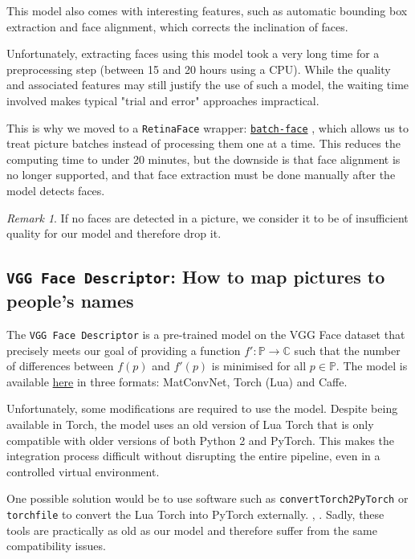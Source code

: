 \documentclass[9pt,twocolumn,twoside]{ilcss}
\theoremstyle{definition}
\theoremstyle{remark}
\newtheorem{remark}{Remark}[section]
\theoremstyle{definition}
\theoremstyle{definition}
\begin{document}
        This model also comes with interesting features, such as automatic bounding box extraction and face alignment, which corrects the inclination of faces.

        Unfortunately, extracting faces using this model took a very long time for a preprocessing step (between 15 and 20 hours using a CPU). While the quality and associated features may still justify the use of such a model, the waiting time involved makes typical "trial and error" approaches impractical.
        
        This is why we moved to a \texttt{RetinaFace} wrapper: \href{https://github.com/elliottzheng/batch-face}{\texttt{batch-face}} \cite{batchFace}, which allows us to treat picture batches instead of processing them one at a time. This reduces the computing time to under 20 minutes, but the downside is that face alignment is no longer supported, and that face extraction must be done manually after the model detects faces.

        \begin{remark}
            If no faces are detected in a picture, we consider it to be of insufficient quality for our model and therefore drop it.
        \end{remark}

    \subsection{\texttt{VGG Face Descriptor}: How to map pictures to people's names}
        The \texttt{VGG Face Descriptor} is a pre-trained model on the VGG Face dataset that precisely meets our goal of providing a function $f':\mathbb{P}\to\mathbb{C}$ such that the number of differences between $f(p)$ and $f'(p)$ is minimised for all $p\in\mathbb{P}$. The model is available \href{https://www.robots.ox.ac.uk/~vgg/software/vgg_face/}{here} in three formats: MatConvNet, Torch (Lua) and Caffe. 
        
        Unfortunately, some modifications are required to use the model. Despite being available in Torch, the model uses an old version of Lua Torch that is only compatible with older versions of both Python 2 and PyTorch. This makes the integration process difficult without disrupting the entire pipeline, even in a controlled virtual environment.

        One possible solution would be to use software such as \texttt{convertTorch2PyTorch} or \texttt{torchfile} to convert the Lua Torch into PyTorch externally. \cite{convertTorch2PyTorch}, \cite{torchfile}. Sadly, these tools are practically as old as our model and therefore suffer from the same compatibility issues.
\end{document}
